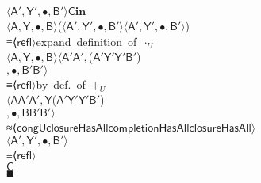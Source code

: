 \documentclass{CSML}
\numberwithin{theorem}{section}
\newcommand{\kw}[1]{\ensuremath{\mathbf{#1}}}
\newcommand{\Conid}[1]{\mathit{#1}}
\newcommand{\Varid}[1]{\mathit{#1}}
\def\resethooks{\global\let\SaveRestoreHook\empty
  \global\let\ColumnHook\empty}
\newcommand{\hsindent}[1]{\quad}\let\hspre\empty
\renewcommand\Varid[1]{\ensuremath{\mathsf{#1}}}
\renewcommand\Conid[1]{\ensuremath{\mathsf{#1}}}
\begin{document}
\begin{hscode}
\>[27]{}\Varid{⟨}\;\Conid{A'}\;{}\<[33]\>[33]{}\Varid{,}\;\Conid{Y'}\;{}\<[39]\>[39]{}\Varid{,•,}\;\Conid{B'}\;{}\<[48]\>[48]{}\Varid{⟩}\;\mathrel{=}\;\Conid{C}\;\kw{in}{}\<[E]\\
\>[19]{}\hsindent{2}{}\<[21]\>[21]{}\Varid{⟨}\;\Conid{A}\;\Varid{,}\;\Conid{Y}\;\Varid{,•,}\;\Conid{B}\;\Varid{⟩}\;{}\<[38]\>[38]{}\;(\Varid{⟨}\;\Conid{A'}\;\Varid{,}\;\Conid{Y'}\;\Varid{,•,}\;\Conid{B'}\;\Varid{⟩}\;\;\Varid{⟨}\;\Conid{A'}\;\Varid{,}\;\Conid{Y'}\;\Varid{,•,}\;\Conid{B'}\;\Varid{⟩}){}\<[E]\\
\>[19]{}≡\!\!⟨\;\Varid{refl}\;\Varid{⟩}\;{}\<[30]\>[30]{}\mbox{\onelinecomment  expand definition of \ensuremath{\mathbin{·_U}}}{}\<[E]\\
\>[19]{}\hsindent{2}{}\<[21]\>[21]{}\Varid{⟨}\;\Conid{A}\;\Varid{,}\;\Conid{Y}\;\Varid{,•,}\;\Conid{B}\;\Varid{⟩}\;{}\<[38]\>[38]{}\;{}\<[43]\>[43]{}\Varid{⟨}\;\Conid{A'}\;\;\Conid{A'}\;{}\<[55]\>[55]{}\Varid{,}\;{}\<[58]\>[58]{}(\Conid{A'}\;\;\Conid{Y'}\;{}\<[70]\>[70]{}\;\Conid{Y'}\;\;\Conid{B'})\;{}\<[E]\\
\>[55]{}\Varid{,•,}\;{}\<[60]\>[60]{}\Conid{B'}\;\;\Conid{B'}\;\Varid{⟩}{}\<[E]\\
\>[19]{}≡\!\!⟨\;\Varid{refl}\;\Varid{⟩}\;{}\<[30]\>[30]{}\mbox{\onelinecomment  by def. of \ensuremath{\mathbin{+_U\!}}}{}\<[E]\\
\>[19]{}\hsindent{2}{}\<[21]\>[21]{}\Varid{⟨}\;{}\<[24]\>[24]{}\Conid{A}\;\;\Conid{A'}\;\;\Conid{A'}\;{}\<[43]\>[43]{}\Varid{,}\;{}\<[49]\>[49]{}\Conid{Y}\;\;(\Conid{A'}\;\;\Conid{Y'}\;{}\<[66]\>[66]{}\;{}\<[70]\>[70]{}\Conid{Y'}\;\;\Conid{B'})\;{}\<[E]\\
\>[43]{}\Varid{,•,}\;{}\<[49]\>[49]{}\Conid{B}\;\;\Conid{B'}\;\;\Conid{B'}\;{}\<[64]\>[64]{}\Varid{⟩}{}\<[E]\\
\>[19]{}≈\!\!⟨\;\Varid{congU}\;\Varid{closureHasAll}\;\Varid{completionHasAll}\;\Varid{closureHasAll}\;\Varid{⟩}\;{}\<[E]\\
\>[19]{}\hsindent{2}{}\<[21]\>[21]{}\Varid{⟨}\;\Conid{A'}\;\Varid{,}\;\Conid{Y'}\;\Varid{,•,}\;\Conid{B'}\;\Varid{⟩}{}\<[E]\\
\>[19]{}≡\!\!⟨\;\Varid{refl}\;\Varid{⟩}\;{}\<[E]\\
\>[19]{}\hsindent{3}{}\<[22]\>[22]{}\Conid{C}{}\<[E]\\
\>[19]{}\Varid{∎}{}\<[E]\ColumnHook
\end{hscode}\resethooks
\end{document}
